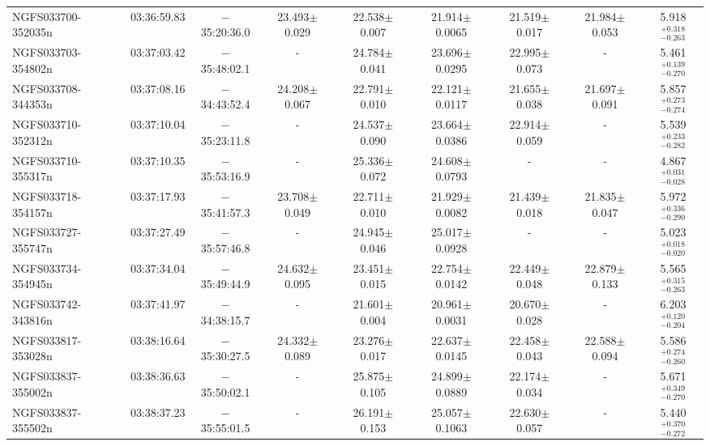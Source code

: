\begin{tabular}{lcccccccc}
  NGFS033700-352035n & 03:36:59.83 &$-$35:20:36.0   &	23.493$\pm$0.029 & 22.538$\pm$0.007  & 21.914$\pm$0.0065 &  21.519$\pm$0.017 &  21.984$\pm$0.053   &  5.918$_{-0.263} ^{+0.318}$ \\
  NGFS033703-354802n & 03:37:03.42 &$-$35:48:02.1   &	     -           & 24.784$\pm$0.041  & 23.696$\pm$0.0295 &  22.995$\pm$0.073 &          -	   &  5.461$_{-0.270} ^{+0.139}$ \\
  NGFS033708-344353n & 03:37:08.16 &$-$34:43:52.4   &	24.208$\pm$0.067 & 22.791$\pm$0.010  & 22.121$\pm$0.0117 &  21.655$\pm$0.038 &  21.697$\pm$0.091   &  5.857$_{-0.274} ^{+0.273}$ \\
  NGFS033710-352312n & 03:37:10.04 &$-$35:23:11.8   &	     -           & 24.537$\pm$0.090  & 23.664$\pm$0.0386 &  22.914$\pm$0.059 &          -	   &  5.539$_{-0.282} ^{+0.233}$ \\
  NGFS033710-355317n & 03:37:10.35 &$-$35:53:16.9   &	     -           & 25.336$\pm$0.072  & 24.608$\pm$0.0793 &          -	     &          -	   &  4.867$_{-0.028} ^{+0.031}$ \\
  NGFS033718-354157n & 03:37:17.93 &$-$35:41:57.3   &	23.708$\pm$0.049 & 22.711$\pm$0.010  & 21.929$\pm$0.0082 &  21.439$\pm$0.018 &  21.835$\pm$0.047   &  5.972$_{-0.290} ^{+0.336}$ \\
  NGFS033727-355747n & 03:37:27.49 &$-$35:57:46.8   &	     -           & 24.945$\pm$0.046  & 25.017$\pm$0.0928 &          -	     &          -	   &  5.023$_{-0.020} ^{+0.018}$ \\
  NGFS033734-354945n & 03:37:34.04 &$-$35:49:44.9   &	24.632$\pm$0.095 & 23.451$\pm$0.015  & 22.754$\pm$0.0142 &  22.449$\pm$0.048 &  22.879$\pm$0.133   &  5.565$_{-0.263} ^{+0.315}$ \\
  NGFS033742-343816n & 03:37:41.97 &$-$34:38:15.7   &	     -           & 21.601$\pm$0.004  & 20.961$\pm$0.0031 &  20.670$\pm$0.028 &          -	   &  6.203$_{-0.204} ^{+0.120}$ \\
  NGFS033817-353028n & 03:38:16.64 &$-$35:30:27.5   &	24.332$\pm$0.089 & 23.276$\pm$0.017  & 22.637$\pm$0.0145 &  22.458$\pm$0.043 &  22.588$\pm$0.094   &  5.586$_{-0.260} ^{+0.274}$ \\
  NGFS033837-355002n & 03:38:36.63 &$-$35:50:02.1   &	     -           & 25.875$\pm$0.105  & 24.899$\pm$0.0889 &  22.174$\pm$0.034 &          -	   &  5.671$_{-0.270} ^{+0.349}$ \\
  NGFS033837-355502n & 03:38:37.23 &$-$35:55:01.5   &	     -           & 26.191$\pm$0.153  & 25.057$\pm$0.1063 &  22.630$\pm$0.057 &          -	   &  5.440$_{-0.272} ^{+0.370}$ \\

\end{tabular}
